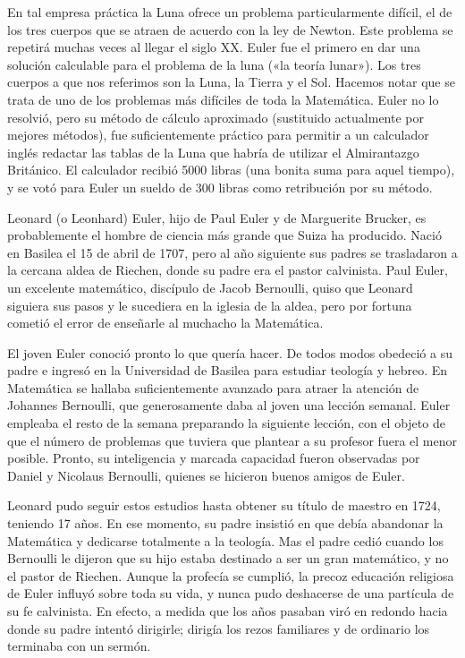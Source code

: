 \documentclass[a4paper, 12pt]{article}
\begin{document}
En tal empresa práctica la Luna ofrece un problema particularmente difícil, el de los tres cuerpos que se atraen de acuerdo con la ley de Newton. Este problema se repetirá muchas veces al llegar el siglo XX. Euler fue el primero en dar una solución calculable para el problema de la luna («la teoría lunar»). Los tres cuerpos a que nos referimos son la Luna, la Tierra y el Sol. Hacemos notar que se trata de uno de los problemas más difíciles de toda la Matemática. Euler no lo resolvió, pero su método de cálculo aproximado (sustituido actualmente por mejores métodos), fue suficientemente práctico para permitir a un calculador inglés redactar las tablas de la Luna que habría de utilizar el Almirantazgo Británico. El calculador recibió 5000 libras (una bonita suma para aquel tiempo), y se votó para Euler un sueldo de 300 libras como retribución por su método.

Leonard (o Leonhard) Euler, hijo de Paul Euler y de Marguerite Brucker, es probablemente el hombre de ciencia más grande que Suiza ha producido. Nació en Basilea el 15 de abril de 1707, pero al año siguiente sus padres se trasladaron a la cercana aldea de Riechen, donde su padre era el pastor calvinista. Paul Euler, un excelente matemático, discípulo de Jacob Bernoulli, quiso que Leonard siguiera sus pasos y le sucediera en la iglesia de la aldea, pero por fortuna cometió el error de enseñarle al muchacho la Matemática.

El joven Euler conoció pronto lo que quería hacer. De todos modos obedeció a su padre e ingresó en la Universidad de Basilea para estudiar teología y hebreo. En Matemática se hallaba suficientemente avanzado para atraer la atención de Johannes Bernoulli, que generosamente daba al joven una lección semanal. Euler empleaba el resto de la semana preparando la siguiente lección, con el objeto de que el número de problemas que tuviera que plantear a su profesor fuera el menor posible. Pronto, su inteligencia y marcada capacidad fueron observadas por Daniel y Nicolaus Bernoulli, quienes se hicieron buenos amigos de Euler.

Leonard pudo seguir estos estudios hasta obtener su título de maestro en 1724, teniendo 17 años. En ese momento, su padre insistió en que debía abandonar la Matemática y dedicarse totalmente a la teología. Mas el padre cedió cuando los Bernoulli le dijeron que su hijo estaba destinado a ser un gran matemático, y no el pastor de Riechen. Aunque la profecía se cumplió, la precoz educación religiosa de Euler influyó sobre toda su vida, y nunca pudo deshacerse de una partícula de su fe calvinista. En efecto, a medida que los años pasaban viró en redondo hacia donde su padre intentó dirigirle; dirigía los rezos familiares y de ordinario los terminaba con un sermón.
\end{document}
